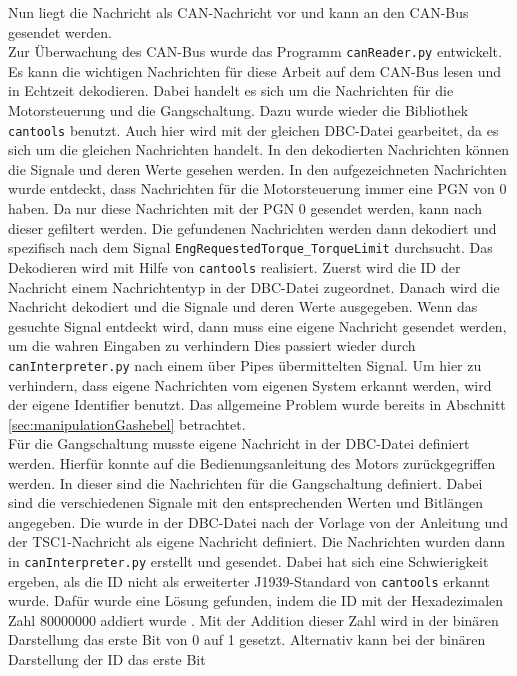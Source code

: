 Nun liegt die Nachricht als
CAN-Nachricht vor und kann an den CAN-Bus gesendet werden.
\\
Zur Überwachung des CAN-Bus wurde das Programm \texttt{canReader.py} entwickelt. Es kann die wichtigen Nachrichten für diese Arbeit 
auf dem CAN-Bus lesen und in Echtzeit dekodieren. Dabei handelt es sich um die Nachrichten für die Motorsteuerung und die Gangschaltung.
Dazu wurde wieder die Bibliothek \texttt{cantools} benutzt. Auch hier wird
mit der gleichen DBC-Datei gearbeitet, da es sich um die gleichen Nachrichten handelt. In den dekodierten Nachrichten
können die Signale und deren Werte gesehen werden. 
In den aufgezeichneten Nachrichten wurde entdeckt, dass Nachrichten für die Motorsteuerung
immer eine PGN von 0 haben. Da nur diese Nachrichten
mit der PGN 0 gesendet werden, kann nach dieser gefiltert werden. Die gefundenen Nachrichten werden dann dekodiert und
spezifisch nach
dem Signal \texttt{EngRequestedTorque\_TorqueLimit} durchsucht. 
Das Dekodieren wird mit Hilfe von \texttt{cantools} realisiert. Zuerst wird die ID der Nachricht einem Nachrichtentyp in der DBC-Datei
zugeordnet. Danach wird die Nachricht dekodiert und die Signale und deren Werte ausgegeben.
Wenn das gesuchte Signal entdeckt wird, dann muss eine eigene Nachricht
gesendet werden, um die wahren Eingaben zu verhindern
Dies passiert wieder durch \texttt{canInterpreter.py} nach 
einem über Pipes übermittelten Signal. Um hier zu verhindern, dass eigene Nachrichten vom eigenen System erkannt werden,
wird der eigene Identifier benutzt. 
Das allgemeine Problem wurde bereits in Abschnitt \ref{sec:manipulationGashebel} betrachtet.
\\
Für die Gangschaltung musste eigene Nachricht in der DBC-Datei definiert werden. Hierfür konnte auf die Bedienungsanleitung
des Motors zurückgegriffen werden. In dieser sind die Nachrichten für die Gangschaltung definiert.
Dabei sind die verschiedenen Signale mit den entsprechenden Werten und Bitlängen angegeben. Die wurde in der DBC-Datei nach der 
Vorlage von der Anleitung und der TSC1-Nachricht als eigene Nachricht definiert.
Die Nachrichten wurden dann in \texttt{canInterpreter.py} erstellt und gesendet.
Dabei hat sich eine Schwierigkeit ergeben, als die ID nicht als erweiterter J1939-Standard von \texttt{cantools} erkannt wurde. 
Dafür wurde eine Lösung gefunden, indem die ID mit der Hexadezimalen Zahl 80000000 addiert wurde \cite{cantoolsIssue}. 
Mit der Addition dieser Zahl
wird in der binären Darstellung das erste Bit von 0 auf 1 gesetzt. Alternativ kann bei der binären Darstellung der ID das erste Bit
